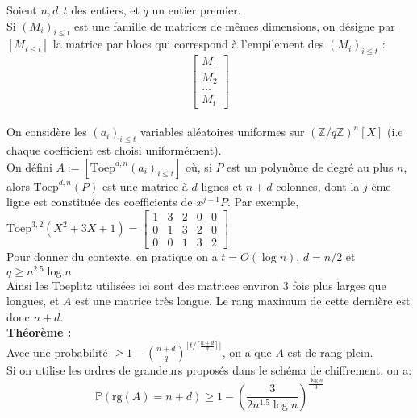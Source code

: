 \documentclass[11pt,a4paper]{article}
\begin{document}
Soient $n,d,t$ des entiers, et $q$ un entier premier.\\
Si $(M_i)_{i \leq t}$ est une famille de matrices de mêmes dimensions, on désigne par $[M_{i\leq t}]$ la matrice par blocs qui correspond à l'empilement des  $(M_i)_{i \leq t}$ : 
$$ \left[\begin{array}{c}
M_1 \\ M_2 \\ \dots \\ M_t
\end{array}\right] $$
 \\

On considère les $(a_i)_{i \leq t}$ variables aléatoires uniformes sur $(\mathbb{Z}/q\mathbb{Z})^n[X]$ (i.e chaque coefficient est choisi uniformément). \\

On défini $A:=[\text{Toep}^{d,n}(a_i)_{i\leq t}]$ où, si $P$ est un polynôme de degré au plus $n$, alors $\text{Toep}^{d,n}(P)$ est une matrice à $d$ lignes et $n+d$ colonnes, dont la $j$-ème ligne est constituée des coefficients de $x^{j-1}P$. Par exemple, \\

$\text{Toep}^{3,2}(X^2 + 3X + 1) = \left[\begin{array}{ccccc}
1&3&2&0&0 \\
0&1&3&2&0 \\ 
0&0&1&3&2 
\end{array}\right]$ \\

Pour donner du contexte, en pratique on a $t=O(\log{n})$, $d=n/2$ et $q \geq n^{2.5}\log{n}$ \\
Ainsi les Toeplitz utilisées ici sont des matrices environ 3 fois plus larges que longues, et $A$ est une matrice très longue. Le rang maximum de cette dernière est donc $n+d$. \\


\textbf{Théorème : \\}
Avec une probabilité $\geq 1 - (\frac{n+d}{q})^{\lfloor t/\lceil\frac{n+d}{d}\rceil\rfloor}$, on a que $A$ est de rang plein. \\
Si on utilise les ordres de grandeurs proposés dans le schéma de chiffrement, on a:  \[\mathbb{P}(\text{rg}(A)=n+d) \geq 1 - (\frac{3}{2 n^{1.5}\log{n}})^{\frac{\log{n}}{3}}\] \\
\end{document}
